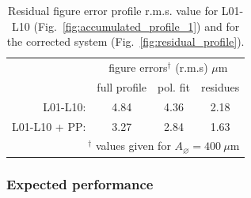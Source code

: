 \begin{refsection}
\begin{table}[h]
    \caption[Residual figure error profile r.m.s. value for L01-L10 and for the corrected system]{Residual figure error profile r.m.s. value for L01-L10 (Fig.~\ref{fig:accumulated_profile_1}) and for the corrected system (Fig.~\ref{fig:residual_profile}).}
    \centering
    \label{tab:corrected}\small
    \begin{tabular}{rccc}
    \hline \hline
    &\multicolumn{3}{c}{figure errors$^\dagger$ (r.m.s) $\mu$m}\\ \cline{2-4}
    &full profile & pol. fit   & residues \\ \hline
    L01-L10:      &4.84  &4.36  &2.18\\
    L01-L10 + PP: &3.27  &2.84  &1.63\\
    \hline \hline
    \multicolumn{4}{r}{\footnotesize{$^\dagger$ values given for $A_{\diameter}=400~\mu\text{m}$}}     
    \end{tabular}
\end{table}

\begin{table}[h]
    \caption[Strehl ratio for L01-L10 and for the corrected system]{Comparison of the Strehl ratio for aberrated system composed of L01-L10 and the corrected system as shown in Fig.~\ref{fig:Strehl_correction}.}\label{tab:Strehl_corrected}%
\end{table}{}

\subsubsection*{Expected performance}


\end{refsection}
